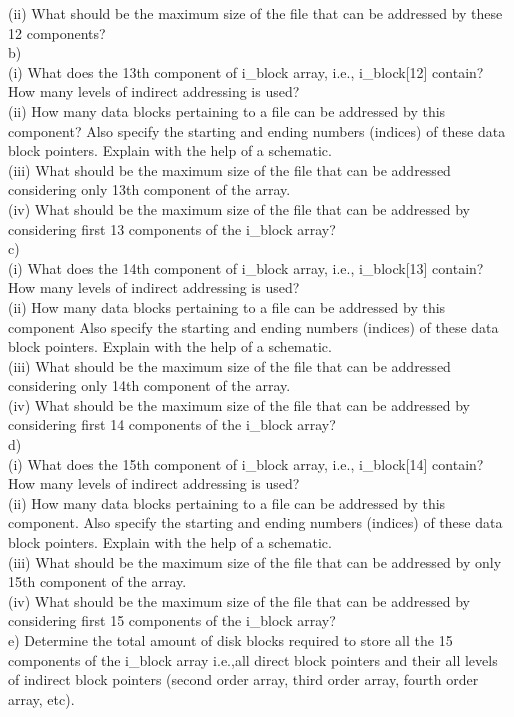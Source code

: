 \documentclass[a4paper,12pt]{article}
\begin{document}
\begin{flushleft}
\begin{enumerate}
(ii) What should be the maximum size of the file that can be addressed by these 12 components?\\
b)\\ (i) What does the 13th component of i\_block array, i.e., i\_block[12] contain? How many levels of indirect addressing is used?\\
(ii) How many data blocks pertaining to a file can be addressed by this component? Also specify the starting and ending numbers (indices) of these data block pointers. Explain with the help of a schematic.\\
(iii) What should be the maximum size of the file that can be addressed considering only 13th component of the array.\\
(iv) What should be the maximum size of the file that can be addressed by considering first 13 components of the i\_block array?\\
c)\\ (i) What does the 14th component of i\_block array, i.e., i\_block[13] contain? How many levels of indirect addressing is used?\\
(ii) How many data blocks pertaining to a file can be addressed by this component Also specify the starting and ending numbers (indices) of these data block pointers. Explain with the help of a schematic.\\
(iii) What should be the maximum size of the file that can be addressed considering only 14th component of the array.\\
(iv) What should be the maximum size of the file that can be addressed by considering first 14 components of the i\_block array?\\
d)\\ (i) What does the 15th component of i\_block array, i.e., i\_block[14] contain? How many levels of indirect addressing is used?\\
(ii) How many data blocks pertaining to a file can be addressed by this component. Also specify the starting and ending numbers (indices) of these data block pointers. Explain with the help of a schematic.\\
(iii) What should be the maximum size of the file that can be addressed by only 15th component of the array.\\
(iv) What should be the maximum size of the file that can be addressed by considering first 15 components of the i\_block array?\\
e) Determine the total amount of disk blocks required to store all the 15 components of the i\_block array i.e.,all direct block pointers and their all levels of indirect block pointers (second order array, third order array, fourth order array, etc).\\

\end{enumerate}
\end{flushleft}
\end{document}
